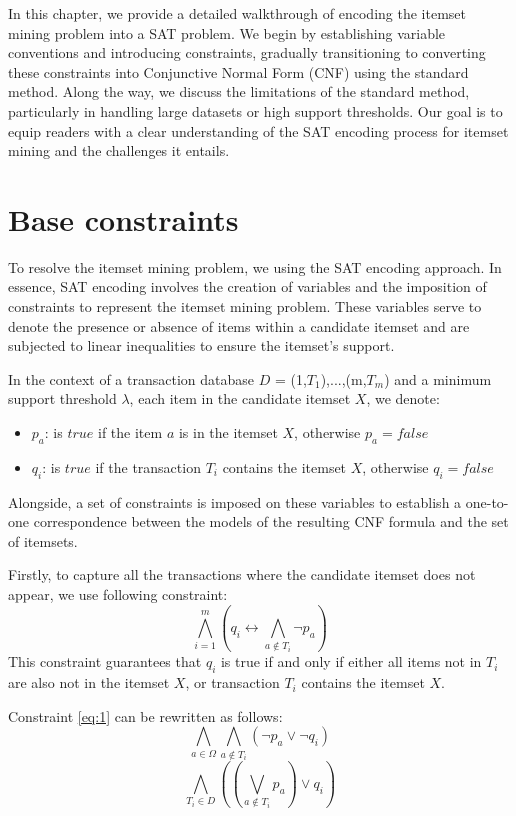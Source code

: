 In this chapter, we provide a detailed walkthrough of encoding the itemset mining problem into a SAT problem.
We begin by establishing variable conventions and introducing constraints, gradually transitioning to converting these constraints into Conjunctive Normal Form (CNF) using the standard method.
Along the way, we discuss the limitations of the standard method, particularly in handling large datasets or high support thresholds.
Our goal is to equip readers with a clear understanding of the SAT encoding process for itemset mining and the challenges it entails.

\section{Base constraints}
To resolve the itemset mining problem, we using the SAT encoding approach\cite{ISM_SATAPPROACH}.
In essence, SAT encoding involves the creation of variables and the imposition of constraints to represent the itemset mining problem.
These variables serve to denote the presence or absence of items within a candidate itemset and are subjected to linear inequalities to ensure the itemset's support.

In the context of a transaction database $D$ = {(1,$T_1$),...,(m,$T_m$)} and a minimum support threshold $\lambda$,
each item in the candidate itemset $X$, we denote:
\begin{itemize}
    \item $p_a$: is $true$ if the item $a$ is in the itemset $X$, otherwise $p_a = false$
    \item $q_i$: is $true$ if the transaction $T_i$ contains the itemset $X$, otherwise $q_i = false$
\end{itemize}
Alongside, a set of constraints is imposed on these variables to establish a one-to-one correspondence between the models of the resulting CNF formula and the set of itemsets.

Firstly, to capture all the transactions where the candidate itemset does not appear, we use following constraint:
\begin{equation}
    \label{eq:1}
    \bigwedge_{i=1}^{m} (q_i \leftrightarrow \bigwedge_{a \notin T_i} \neg p_a)
\end{equation}
This constraint guarantees that $q_i$ is true if and only if either all items not in $T_i$ are also not in the itemset $X$, or transaction $T_i$ contains the itemset $X$.

Constraint \ref{eq:1} can be rewritten as follows:
\begin{equation}
    \label{eq:2}
    \bigwedge_{a \in \Omega} \bigwedge_{a \notin T_i} (\neg p_a \vee \neg q_i)
\end{equation}
\begin{equation}
    \label{eq:3}
    \bigwedge_{T_i \in D} ((\bigvee_{a \notin T_i} p_a) \vee q_i)
\end{equation}


